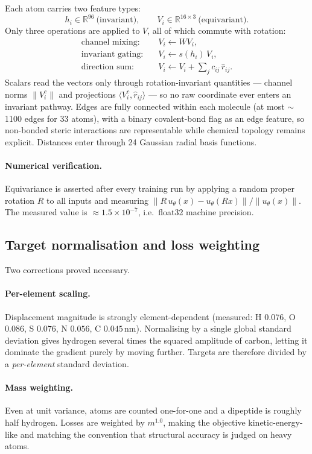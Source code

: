 \documentclass[11pt,a4paper]{article}
\begin{document}
Each atom carries two feature types:
\[
h_i \in \mathbb{R}^{96} \ \text{(invariant)}, \qquad
V_i \in \mathbb{R}^{16\times 3} \ \text{(equivariant)} .
\]
Only three operations are applied to $V$, all of which commute with rotation:
\begin{align*}
\text{channel mixing:}   &\quad V_i \leftarrow W V_i, \\
\text{invariant gating:} &\quad V_i \leftarrow s(h_i)\, V_i, \\
\text{direction sum:}    &\quad V_i \leftarrow V_i + \textstyle\sum_j c_{ij}\,\hat{r}_{ij} .
\end{align*}
Scalars read the vectors only through rotation-invariant quantities --- channel
norms $\|V_i^c\|$ and projections $\langle V_i^c, \hat{r}_{ij}\rangle$ --- so no
raw coordinate ever enters an invariant pathway. Edges are fully connected
within each molecule (at most $\sim$1100 edges for 33 atoms), with a binary
covalent-bond flag as an edge feature, so non-bonded steric interactions are
representable while chemical topology remains explicit. Distances enter through
24 Gaussian radial basis functions.

\paragraph{Numerical verification.} Equivariance is asserted after every
training run by applying a random proper rotation $R$ to all inputs and
measuring $\|R\,u_\theta(x) - u_\theta(Rx)\| / \|u_\theta(x)\|$. The measured
value is $\approx 1.5\times10^{-7}$, i.e.\ float32 machine precision.

\subsection{Target normalisation and loss weighting}
Two corrections proved necessary.

\paragraph{Per-element scaling.} Displacement magnitude is strongly
element-dependent (measured: H $0.076$, O $0.086$, S $0.076$, N $0.056$,
C $0.045$\,nm). Normalising by a single global standard deviation gives
hydrogen several times the squared amplitude of carbon, letting it dominate the
gradient purely by moving further. Targets are therefore divided by a
\emph{per-element} standard deviation.

\paragraph{Mass weighting.} Even at unit variance, atoms are counted
one-for-one and a dipeptide is roughly half hydrogen. Losses are weighted by
$m^{1.0}$, making the objective kinetic-energy-like and matching the convention
that structural accuracy is judged on heavy atoms.
\end{document}
